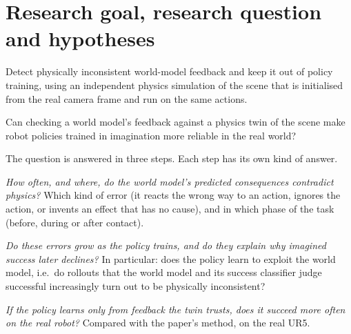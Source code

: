 \section{Research goal, research question and hypotheses}\label{method:sec:rq}

\begin{rqbox}[title={Research goal}]
Detect physically inconsistent world-model feedback and keep it out of policy training, using an independent physics simulation of the scene that is initialised from the real camera frame and run on the same actions.
\end{rqbox}

\begin{rqbox}[title={Research question}]
Can checking a world model's feedback against a physics twin of the scene make robot policies trained in imagination more reliable in the real world?
\end{rqbox}

The question is answered in three steps. Each step has its own kind of answer.

\begin{description}[leftmargin=0pt,itemsep=3pt]
\item[RQ1 · Detect.] \emph{How often, and where, do the world model's predicted consequences contradict physics?} Which kind of error (it reacts the wrong way to an action, ignores the action, or invents an effect that has no cause), and in which phase of the task (before, during or after contact).
\item[RQ2 · Explain.] \emph{Do these errors grow as the policy trains, and do they explain why imagined success later declines?} In particular: does the policy learn to exploit the world model, i.e.\ do rollouts that the world model and its success classifier judge successful increasingly turn out to be physically inconsistent?
\item[RQ3 · Improve.] \emph{If the policy learns only from feedback the twin trusts, does it succeed more often on the real robot?} Compared with the paper's method, on the real UR5.
\end{description}

